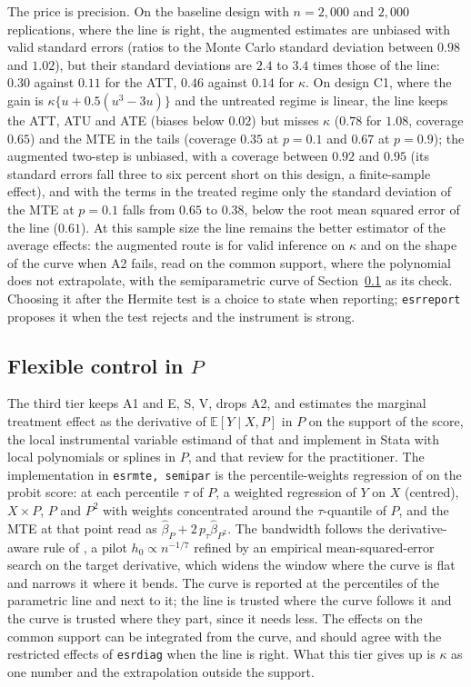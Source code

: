 \documentclass[11pt,a4paper]{article}
\theoremstyle{plain}
\theoremstyle{definition}
\theoremstyle{remark}
\newcommand{\E}{\mathbb{E}}
\newcommand{\1}{\mathbf{1}}
\newcommand{\cmd}[1]{\texttt{#1}}
\begin{document}
The price is precision. On the baseline design with $n=2{,}000$ and
$2{,}000$ replications, where the line is right, the augmented estimates
are unbiased with valid standard errors (ratios to the Monte Carlo
standard deviation between $0.98$ and $1.02$), but their standard
deviations are $2.4$ to $3.4$ times those of the line: $0.30$ against
$0.11$ for the ATT, $0.46$ against $0.14$ for $\kappa$. On design C1,
where the gain is $\kappa\{u+0.5(u^3-3u)\}$ and the untreated regime is
linear, the line keeps the ATT, ATU and ATE (biases below $0.02$) but
misses $\kappa$ ($0.78$ for $1.08$, coverage $0.65$) and the MTE in the
tails (coverage $0.35$ at $p=0.1$ and $0.67$ at $p=0.9$); the augmented
two-step is unbiased, with a coverage between $0.92$ and $0.95$ (its
standard errors fall three to six percent short on this design, a
finite-sample effect), and with the terms in the treated regime only the
standard deviation of the MTE at $p=0.1$ falls from $0.65$ to $0.38$,
below the root mean squared error of the line ($0.61$). At this sample
size the line remains the better estimator of the average effects: the
augmented route is for valid inference on $\kappa$ and on the shape of the
curve when A2 fails, read on the common support, where the polynomial
does not extrapolate, with the semiparametric curve of
Section~\ref{sec:est:control} as its check. Choosing it after the Hermite
test is a choice to state when reporting; \cmd{esrreport} proposes it
when the test rejects and the instrument is strong.

\subsection{Flexible control in \texorpdfstring{$P$}{P}}\label{sec:est:control}

The third tier keeps A1 and E, S, V, drops A2, and estimates the marginal
treatment effect as the derivative of $\E[Y\mid X,P]$ in $P$ on the
support of the score, the local instrumental variable estimand of
\citet{heckman2005} that \citet{brave2014} and \citet{andresen2018}
implement in Stata with local polynomials or splines in $P$, and that
\citet{cornelissen2016} review for the practitioner. The implementation
in \cmd{esrmte, semipar} is
the percentile-weights regression of \citet{araar2026pwr} on the probit
score: at each percentile $\tau$ of $P$, a weighted regression of $Y$ on
$X$ (centred), $X\times P$, $P$ and $P^2$ with weights concentrated
around the $\tau$-quantile of $P$, and the MTE at that point read as
$\hat\beta_P+2\,p_\tau\hat\beta_{P^2}$. The bandwidth follows the
derivative-aware rule of \citet{araar2026msat}, a pilot $h_0\propto
n^{-1/7}$ refined by an empirical mean-squared-error search on the
target derivative, which widens the window where the curve is flat and
narrows it where it bends. The curve is reported at the percentiles of
the parametric line and next to it; the line is trusted where the curve
follows it and the curve is trusted where they part, since it needs less.
The effects on the common support can be integrated from the curve, and
should agree with the restricted effects of \cmd{esrdiag} when the line
is right. What this tier gives up is $\kappa$ as one number and the
extrapolation outside the support.
\end{document}
